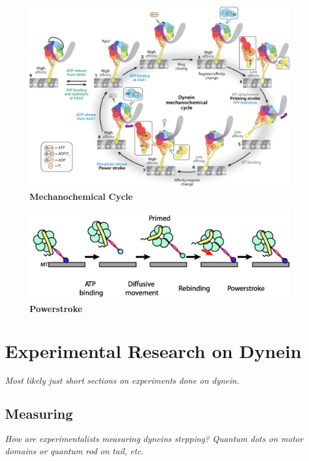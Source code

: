 \begin{figure}[H]
	\centering
	\includegraphics[width=1\columnwidth]{Figures/mechanochemical_cycle.jpeg}
	\caption[Mechanochemical Cycle]{\textbf{Mechanochemical Cycle}  \cite{Cianfrocco2015mechanism}}
	\label{fig:MechanochemicalCycle}
\end{figure}

\begin{figure}[H]
	\centering
	\includegraphics[width=1\columnwidth]{Figures/powerstroke.jpeg}
	\caption[Powerstroke]{\textbf{Powerstroke}  \cite{Carter2010communication} }
	\label{fig:Powerstroke}
\end{figure}


\section{Experimental Research on Dynein}
\textit{Most likely just short sections on experiments done on dynein.}
\subsection{Measuring}
\textit{How are experimentalists measuring dyneins stepping? Quantum dots on motor domains or quantum rod on tail, etc. }

